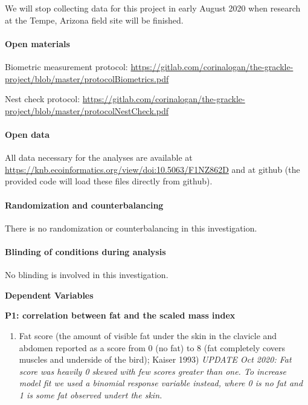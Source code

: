 \documentclass[
]{article}
\providecommand{\tightlist}{%
  \setlength{\itemsep}{0pt}\setlength{\parskip}{0pt}}
\begin{document}
We will stop collecting data for this project in early August 2020 when
research at the Tempe, Arizona field site will be finished.

\hypertarget{open-materials}{%
\paragraph{\texorpdfstring{\textbf{Open
materials}}{Open materials}}\label{open-materials}}

Biometric measurement protocol:
\url{https://gitlab.com/corinalogan/the-grackle-project/blob/master/protocolBiometrics.pdf}

Nest check protocol:
\url{https://gitlab.com/corinalogan/the-grackle-project/blob/master/protocolNestCheck.pdf}

\hypertarget{open-data}{%
\paragraph{\texorpdfstring{\textbf{Open
data}}{Open data}}\label{open-data}}

All data necessary for the analyses are available at
\url{https://knb.ecoinformatics.org/view/doi:10.5063/F1NZ862D} and at
github (the provided code will load these files directly from github).

\hypertarget{randomization-and-counterbalancing}{%
\paragraph{\texorpdfstring{\textbf{Randomization and
counterbalancing}}{Randomization and counterbalancing}}\label{randomization-and-counterbalancing}}

There is no randomization or counterbalancing in this investigation.

\hypertarget{blinding-of-conditions-during-analysis}{%
\paragraph{\texorpdfstring{\textbf{Blinding of conditions during
analysis}}{Blinding of conditions during analysis}}\label{blinding-of-conditions-during-analysis}}

No blinding is involved in this investigation.

\textbf{Dependent Variables}

\textbf{P1: correlation between fat and the scaled mass index}

\begin{enumerate}
\def\labelenumi{\arabic{enumi})}
\tightlist
\item
  Fat score (the amount of visible fat under the skin in the clavicle
  and abdomen reported as a score from 0 (no fat) to 8 (fat completely
  covers muscles and underside of the bird); Kaiser 1993) \emph{UPDATE
  Oct 2020: Fat score was heavily 0 skewed with few scores greater than
  one. To increase model fit we used a binomial response variable
  instead, where 0 is no fat and 1 is some fat observed undert the
  skin.}
\end{enumerate}
\end{document}
